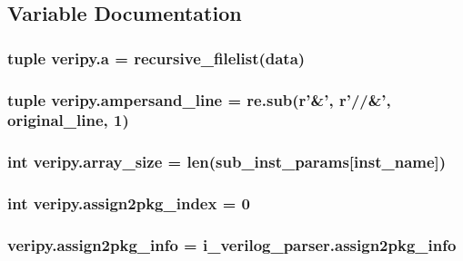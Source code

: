\subsection{Variable Documentation}
\hypertarget{namespaceveripy_acd1090fc8e7408283bb12a2ff26d2750}{
\subsubsection[{a}]{\setlength{\rightskip}{0pt plus 5cm}tuple veripy.\-a = recursive\-\_\-filelist({\bf data})}}\label{namespaceveripy_acd1090fc8e7408283bb12a2ff26d2750}
\hypertarget{namespaceveripy_afea06b60383bdad409732711cafd8d5e}{
\subsubsection[{ampersand\-\_\-line}]{\setlength{\rightskip}{0pt plus 5cm}tuple veripy.\-ampersand\-\_\-line = re.\-sub(r'\&', r'//\&', {\bf original\-\_\-line}, 1)}}\label{namespaceveripy_afea06b60383bdad409732711cafd8d5e}
\hypertarget{namespaceveripy_a72b25fc3b125307dcf8fff0f983bea47}{
\subsubsection[{array\-\_\-size}]{\setlength{\rightskip}{0pt plus 5cm}int veripy.\-array\-\_\-size = len({\bf sub\-\_\-inst\-\_\-params}\mbox{[}{\bf inst\-\_\-name}\mbox{]})}}\label{namespaceveripy_a72b25fc3b125307dcf8fff0f983bea47}
\hypertarget{namespaceveripy_ae065d2f646ed5d1156a25bb21084cbd6}{
\subsubsection[{assign2pkg\-\_\-index}]{\setlength{\rightskip}{0pt plus 5cm}int veripy.\-assign2pkg\-\_\-index = 0}}\label{namespaceveripy_ae065d2f646ed5d1156a25bb21084cbd6}
\hypertarget{namespaceveripy_a95394440df7568c06df836060d2c1f5e}{
\subsubsection[{assign2pkg\-\_\-info}]{\setlength{\rightskip}{0pt plus 5cm}veripy.\-assign2pkg\-\_\-info = i\-\_\-verilog\-\_\-parser.\-assign2pkg\-\_\-info}}\label{namespaceveripy_a95394440df7568c06df836060d2c1f5e}
